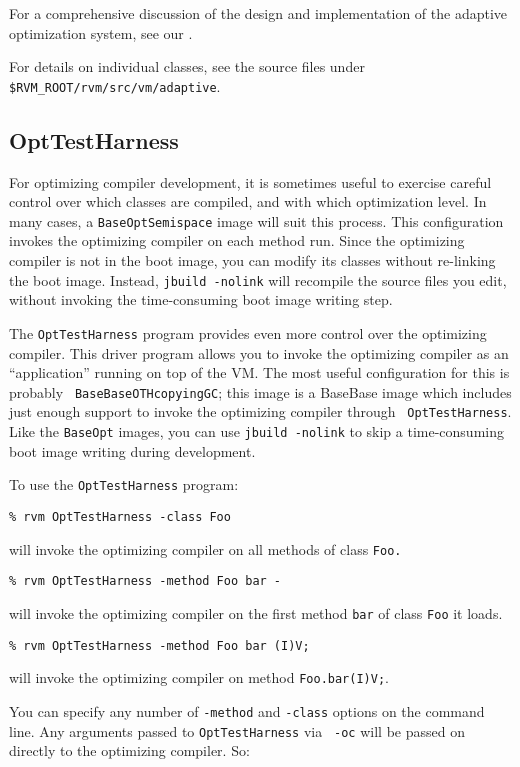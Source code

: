 For a comprehensive discussion of the design and implementation of the
adaptive optimization system, see our 
. 

For details on individual classes, see the source files under 
{\tt \$RVM\_ROOT/rvm/src/vm/adaptive}.

\subsection{OptTestHarness}

For optimizing compiler development, it is sometimes useful to exercise
careful control over which classes are compiled, and with which
optimization level.  In many cases, a {\tt BaseOptSemispace} image will
suit this process.  This configuration invokes the optimizing compiler on
each method run.  Since the optimizing compiler is not in the boot image, 
you can modify its classes without re-linking the boot image.  Instead,
{\tt jbuild -nolink} will recompile the source files you edit, without
invoking the time-consuming boot image writing step.

The {\tt OptTestHarness} program provides even more control over the
optimizing compiler.  This driver program allows you to invoke the
optimizing compiler as an ``application'' running on top of the VM.
The most useful configuration for this is probably {\tt
BaseBaseOTHcopyingGC}; this image is a BaseBase image which includes just
enough support to invoke the optimizing compiler through {\tt
OptTestHarness}.  Like the {\tt BaseOpt} images, you can use {\tt jbuild
-nolink} to skip a time-consuming boot image writing during development.

To use the {\tt OptTestHarness} program:
\begin{verbatim}
% rvm OptTestHarness -class Foo
\end{verbatim}
will invoke the optimizing compiler on all methods of class {\tt Foo.}

\begin{verbatim}
% rvm OptTestHarness -method Foo bar - 
\end{verbatim}
will invoke the optimizing compiler on the first method {\tt bar} of class
{\tt Foo} it loads.

\begin{verbatim}
% rvm OptTestHarness -method Foo bar (I)V; 
\end{verbatim} 
will invoke the optimizing compiler on method {\tt Foo.bar(I)V;}.

You can specify any number of {\tt -method} and {\tt -class} options on
the command line.  Any arguments passed to {\tt OptTestHarness} via {\tt
-oc} will be passed on directly to the optimizing compiler.  So:

